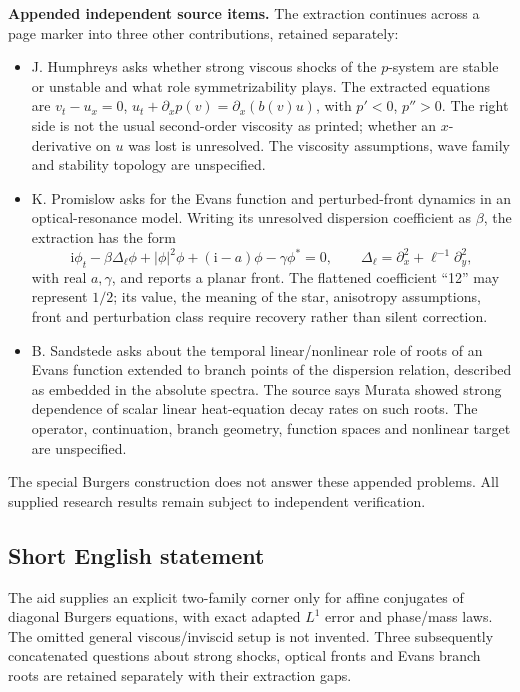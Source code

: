 \documentclass[11pt]{article}
\begin{document}
\textbf{Appended independent source items.} The extraction continues across a page marker into three other contributions, retained separately:
\begin{itemize}
\item J. Humphreys asks whether strong viscous shocks of the \(p\)-system are stable or unstable and what role symmetrizability plays. The extracted equations are \(v_t-u_x=0\), \(u_t+\partial_xp(v)=\partial_x(b(v)u)\), with \(p'<0\), \(p''>0\). The right side is not the usual second-order viscosity as printed; whether an \(x\)-derivative on \(u\) was lost is unresolved. The viscosity assumptions, wave family and stability topology are unspecified.
\item K. Promislow asks for the Evans function and perturbed-front dynamics in an optical-resonance model. Writing its unresolved dispersion coefficient as \(\beta\), the extraction has the form
\[
 \mathrm i\phi_t-\beta\Delta_\ell\phi+|\phi|^2\phi
 +(\mathrm i-a)\phi-\gamma\phi^*=0,\qquad
 \Delta_\ell=\partial_x^2+\ell^{-1}\partial_y^2,
\]
with real \(a,\gamma\), and reports a planar front. The flattened coefficient ``12'' may represent \(1/2\); its value, the meaning of the star, anisotropy assumptions, front and perturbation class require recovery rather than silent correction.
\item B. Sandstede asks about the temporal linear/nonlinear role of roots of an Evans function extended to branch points of the dispersion relation, described as embedded in the absolute spectra. The source says Murata showed strong dependence of scalar linear heat-equation decay rates on such roots. The operator, continuation, branch geometry, function spaces and nonlinear target are unspecified.
\end{itemize}
The special Burgers construction does not answer these appended problems. All supplied research results remain subject to independent verification.
\subsection{Short English statement}
The aid supplies an explicit two-family corner only for affine conjugates of diagonal Burgers equations, with exact adapted \(L^1\) error and phase/mass laws. The omitted general viscous/inviscid setup is not invented. Three subsequently concatenated questions about strong shocks, optical fronts and Evans branch roots are retained separately with their extraction gaps.
\end{document}
